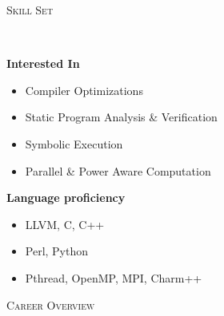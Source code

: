 \documentclass[9pt]{article}
\newenvironment{changemargin}[2]{%
  \begin{list}{}{%
    \setlength{\topsep}{0pt}%
    \setlength{\leftmargin}{#1}%
    \setlength{\rightmargin}{#2}%
    \setlength{\listparindent}{\parindent}%
    \setlength{\itemindent}{\parindent}%
    \setlength{\parsep}{\parskip}%
  }%
  \item[]}{\end{list}
}
\newcommand{\lineover}{
	\begin{changemargin}{-0.05in}{-0.05in}
		\vspace*{-8pt}
		\hrulefill \\
		\vspace*{-2pt}
	\end{changemargin}
}
\newcommand{\header}[1]{
	\begin{changemargin}{-0.5in}{-0.5in}
		\scshape{#1}\\
  	\lineover
	\end{changemargin}
}
\newenvironment{body} {
	\vspace*{-16pt}
	\begin{changemargin}{-0.25in}{-0.5in}
  }	
	{\end{changemargin}
}
\begin{document}
\header{Skill Set}
\begin{body}
	\vspace{14pt}
	  \textbf{Interested In}\\
	  \begin{itemize} \itemsep -0pt
		\item Compiler Optimizations \\
		\item Static Program Analysis \& Verification \\
                \item Symbolic Execution \\                
		\item Parallel \& Power Aware Computation \\
	  \end{itemize}

        \medskip  
	  \textbf{Language proficiency}\\
	  \begin{itemize} \itemsep -0pt
		\item LLVM, C, C++
		\item Perl, Python
		\item Pthread, OpenMP, MPI, Charm++
	  \end{itemize}
\end{body}


\smallskip


\header{Career Overview}
\end{document}
